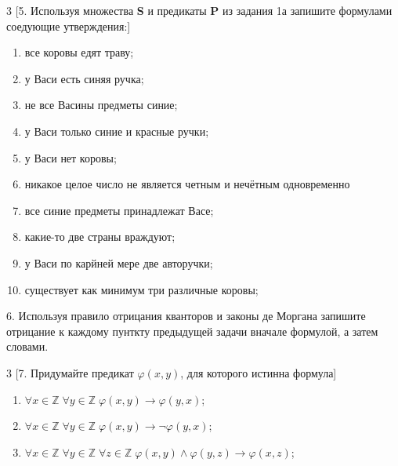 \documentclass[a4paper,10pt]{article}
\begin{document}
\begin{multicols}{3}
	[5. Используя множества \textbf S и предикаты \textbf P из задания 1а запишите формулами соедующие утверждения:]
	\begin{enumerate}[label=(\arabic*)\,]
		\item все коровы едят траву;
		\item у Васи есть синяя ручка;
		\item не все Васины предметы синие;
		\item у Васи только синие и красные ручки;
		\item у Васи нет коровы;
		\item никакое целое число не является четным и нечётным одновременно
		\item все синие предметы принадлежат Васе;
		\item какие-то две страны враждуют;
		\item у Васи по карйней мере две авторучки;
		\item существует как минимум три различные коровы;
	\end{enumerate}
\end{multicols}
6. Используя правило отрицания кванторов и законы де Моргана запишите отрицание к каждому пунткту предыдущей задачи вначале формулой, а затем словами.

\begin{multicols}{3}
	[7. Придумайте предикат $\varphi(x,y)$, для которого истинна формула]
	\begin{enumerate}[label=(\arabic*)\,]
		\item $\forall x\in\mathbb Z\; \forall y\in\mathbb Z\; \varphi(x,y)\to\varphi(y,x)$;
		\item $\forall x\in\mathbb Z\; \forall y\in\mathbb Z\; \varphi(x,y)\to\lnot\varphi(y,x)$;
		\item $\forall x\in\mathbb Z\; \forall y\in\mathbb Z\; \forall z\in\mathbb Z\; \varphi(x,y)\land\varphi(y,z)\to\varphi(x,z)$;
	\end{enumerate}
\end{multicols}
\end{document}
